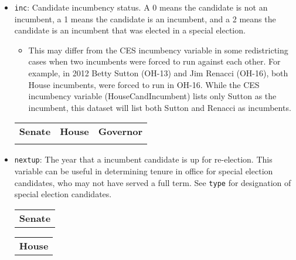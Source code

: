\documentclass[12pt]{article}
\begin{document}
\begin{itemize}[leftmargin=*]
\item \texttt{inc}: Candidate incumbency status. A 0 means the candidate is not an incumbent, a 1 means the candidate is an incumbent, and a 2 means the candidate is an incumbent that was elected in a special election. 
\begin{itemize}
\item This may differ from the CES incumbency variable in some redistricting cases when two incumbents were forced to run against each other. For example, in 2012 Betty Sutton (OH-13) and Jim Renacci (OH-16), both House incumbents, were forced to run in OH-16. While the CES incumbency variable (HouseCandIncumbent) lists only Sutton as the incumbent, this dataset will list both Sutton and Renacci as incumbents. 
\end{itemize}

    \begin{tabularx}{\linewidth}{CCC}
    \textbf{Senate} & \textbf{House} & \textbf{Governor}\\
     &  & 
    \end{tabularx}


\item \texttt{nextup}: The year that a incumbent candidate is up for re-election. This variable can be useful in determining tenure in office for special election candidates, who may not have served a full term. See \texttt{type} for designation of special election candidates. 		

\begin{tabularx}{\linewidth}{C}
\textbf{Senate}\\

\end{tabularx}

\begin{tabularx}{\linewidth}{C}
\textbf{House}\\
 
\end{tabularx}


\end{itemize}
\end{document}
